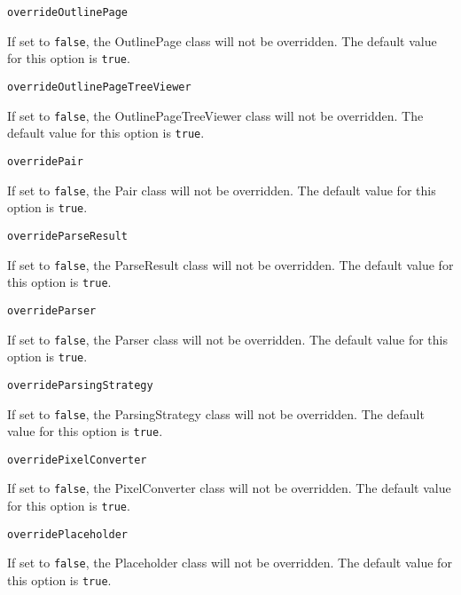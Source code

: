 \noindent\texttt{overrideOutlinePage}
\begin{myindentpar}{1cm}
If set to \texttt{false}, the OutlinePage class will not be overridden. The default value for this option is \texttt{true}.
\end{myindentpar}

\noindent\texttt{overrideOutlinePageTreeViewer}
\begin{myindentpar}{1cm}
If set to \texttt{false}, the OutlinePageTreeViewer class will not be overridden. The default value for this option is \texttt{true}.
\end{myindentpar}

\noindent\texttt{overridePair}
\begin{myindentpar}{1cm}
If set to \texttt{false}, the Pair class will not be overridden. The default value for this option is \texttt{true}.
\end{myindentpar}

\noindent\texttt{overrideParseResult}
\begin{myindentpar}{1cm}
If set to \texttt{false}, the ParseResult class will not be overridden. The default value for this option is \texttt{true}.
\end{myindentpar}

\noindent\texttt{overrideParser}
\begin{myindentpar}{1cm}
If set to \texttt{false}, the Parser class will not be overridden. The default value for this option is \texttt{true}.
\end{myindentpar}

\noindent\texttt{overrideParsingStrategy}
\begin{myindentpar}{1cm}
If set to \texttt{false}, the ParsingStrategy class will not be overridden. The default value for this option is \texttt{true}.
\end{myindentpar}

\noindent\texttt{overridePixelConverter}
\begin{myindentpar}{1cm}
If set to \texttt{false}, the PixelConverter class will not be overridden. The default value for this option is \texttt{true}.
\end{myindentpar}

\noindent\texttt{overridePlaceholder}
\begin{myindentpar}{1cm}
If set to \texttt{false}, the Placeholder class will not be overridden. The default value for this option is \texttt{true}.
\end{myindentpar}

